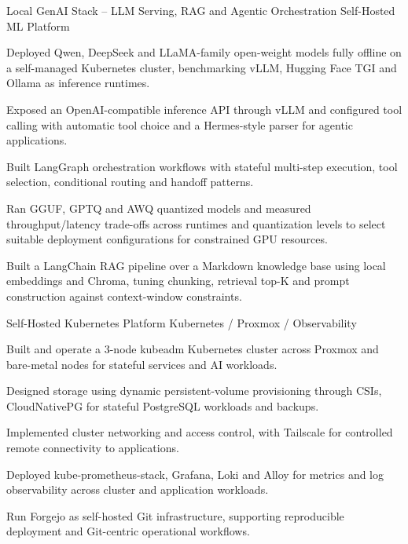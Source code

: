 \documentclass[11pt, a4paper]{awesome-cv}
\begin{document}
\begin{cventries}

  \cventry
    {Local GenAI Stack -- LLM Serving, RAG and Agentic Orchestration}
    {Self-Hosted ML Platform}
    {}
    {}
    {
      \begin{cvitems}
        \item {Deployed Qwen, DeepSeek and LLaMA-family open-weight models fully offline on a self-managed Kubernetes cluster, benchmarking vLLM, Hugging Face TGI and Ollama as inference runtimes.}
        \item {Exposed an OpenAI-compatible inference API through vLLM and configured tool calling with automatic tool choice and a Hermes-style parser for agentic applications.}
        \item {Built LangGraph orchestration workflows with stateful multi-step execution, tool selection, conditional routing and handoff patterns.}
        \item {Ran GGUF, GPTQ and AWQ quantized models and measured throughput/latency trade-offs across runtimes and quantization levels to select suitable deployment configurations for constrained GPU resources.}
        \item {Built a LangChain RAG pipeline over a Markdown knowledge base using local embeddings and Chroma, tuning chunking, retrieval top-K and prompt construction against context-window constraints.}
      \end{cvitems}
    }

  \cventry
    {Self-Hosted Kubernetes Platform}
    {Kubernetes / Proxmox / Observability}
    {}
    {}
    {
      \begin{cvitems}
        \item {Built and operate a 3-node kubeadm Kubernetes cluster across Proxmox and bare-metal nodes for stateful services and AI workloads.}
        \item {Designed storage using dynamic persistent-volume provisioning through CSIs, CloudNativePG for stateful PostgreSQL workloads and backups.}
        \item {Implemented cluster networking and access control, with Tailscale for controlled remote connectivity to applications.}
        \item {Deployed kube-prometheus-stack, Grafana, Loki and Alloy for metrics and log observability across cluster and application workloads.}
        \item {Run Forgejo as self-hosted Git infrastructure, supporting reproducible deployment and Git-centric operational workflows.}
      \end{cvitems}
    }


\end{cventries}
\end{document}
